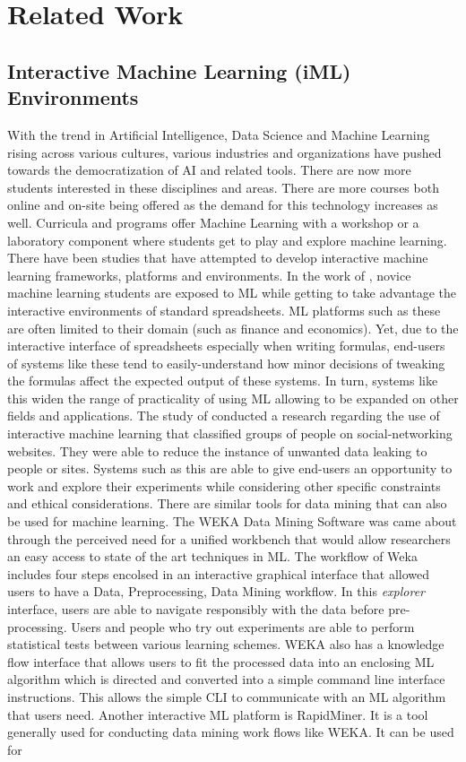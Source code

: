 \documentclass{sigchi}
\begin{document}
\section{Related Work}
\subsection{Interactive Machine Learning (iML) Environments}

With the trend in Artificial Intelligence, Data Science and Machine Learning rising across various cultures, various industries and organizations have pushed towards the democratization of AI and related tools. There are now more students interested in these disciplines and areas. There are more courses both online and on-site being offered as the demand for this technology increases as well. Curricula and programs offer Machine Learning with a workshop or a laboratory component where students get to play and explore machine learning. There have been studies that have attempted to develop interactive machine learning frameworks, platforms and environments. In the work of \cite{sarkar2015interactive}, novice machine learning students are exposed to ML while getting to take advantage the interactive environments of standard spreadsheets. ML platforms such as these are often limited to their domain (such as finance and economics). Yet, due to the interactive interface of spreadsheets especially when writing formulas, end-users of systems like these tend to easily-understand how minor decisions of tweaking the formulas affect the expected output of these systems. In turn, systems like this widen the range of practicality of using ML allowing to be expanded on other fields and applications. The study of \cite{amershi2012regroup} conducted a research regarding the use of interactive machine learning that classified groups of people on social-networking websites. They were able to reduce the instance of unwanted data leaking to people or sites. Systems such as this are able to give end-users an opportunity to work and explore their experiments while considering other specific constraints and ethical considerations. There are similar tools for data mining that can also be used for machine learning. The WEKA Data Mining Software \cite{Hall2009weka} was came about through the perceived need for a unified workbench that would allow researchers an easy access to state of the art techniques in ML. The workflow of Weka includes four steps encolsed in an interactive graphical interface \cite{kulkarni2016weka} that allowed users to have a Data, Preprocessing, Data Mining workflow. In this \textit{explorer} interface, users are able to navigate responsibly with the data before pre-processing. Users and people who try out experiments are able to perform statistical tests between various learning schemes. WEKA also has a knowledge flow interface that allows users to fit the processed data into an enclosing ML algorithm which is directed and converted into a simple command line interface instructions. This allows the simple CLI to communicate with an ML algorithm that users need. Another interactive ML platform is RapidMiner. It is a tool generally used for conducting data mining work flows like WEKA. It can be used for 
\end{document}
